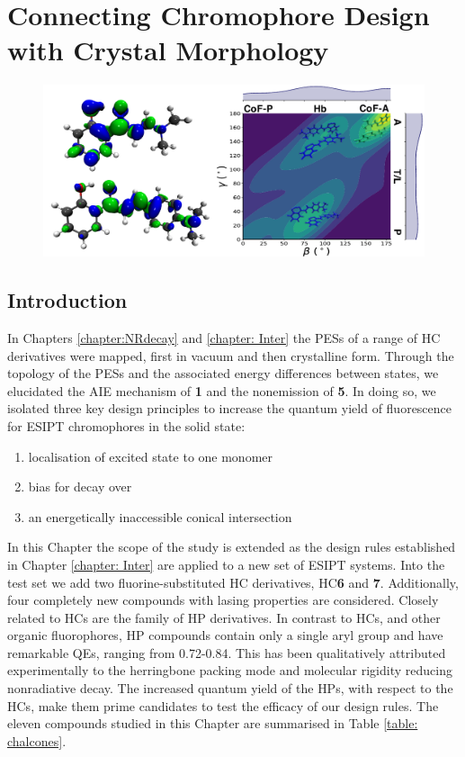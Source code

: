 \chapter[Connecting Chromophore Design with Crystal Morphology]{Connecting Chromophore Design with Crystal Morphology}
\label{chapter: Connecting}
\begin{figure}[H]
\centering
  \includegraphics[width=0.7\linewidth]{5ConnectingCrystalStructure/3toc.pdf}
\end{figure}
\section{Introduction}\label{section: Connecting_Introduction}

In Chapters \ref{chapter:NRdecay} and \ref{chapter: Inter} the \acp{PES} of a range of \ac{HC} derivatives were mapped, first in vacuum and then crystalline form. Through the topology of the PESs and the associated energy differences between states, we elucidated the AIE mechanism of \textbf{1} and the nonemission of \textbf{5}. In doing so, we isolated three key design principles to increase the quantum yield of fluorescence for ESIPT chromophores in the solid state:
\begin{enumerate}
    \item localisation of excited state to one monomer 
    \item bias for \Kstar{} decay over \Estar{}
    \item an energetically inaccessible conical intersection
\end{enumerate}

In this Chapter the scope of the study is extended as the design rules established in Chapter  \ref{chapter: Inter} are applied to a new set of ESIPT systems. Into the test set we add two fluorine-substituted \ac{HC} derivatives, \ac{HC}\textbf{6} and \textbf{7}.\cite{Cheng2016} Additionally, four completely new compounds with lasing properties are considered. Closely related to \acp{HC} are the family of \ac{HP} derivatives.\cite{Tang2016} In contrast to \acp{HC}, and other organic fluorophores, \ac{HP} compounds contain only a single aryl group and have remarkable QEs, ranging from 0.72-0.84. This has been qualitatively attributed experimentally to the herringbone packing mode and molecular rigidity reducing nonradiative decay. The increased quantum yield of the \acp{HP}, with respect to the \acp{HC}, make them prime candidates to test the efficacy of our  design rules. The eleven compounds studied in this Chapter are summarised in Table \ref{table: chalcones}.

